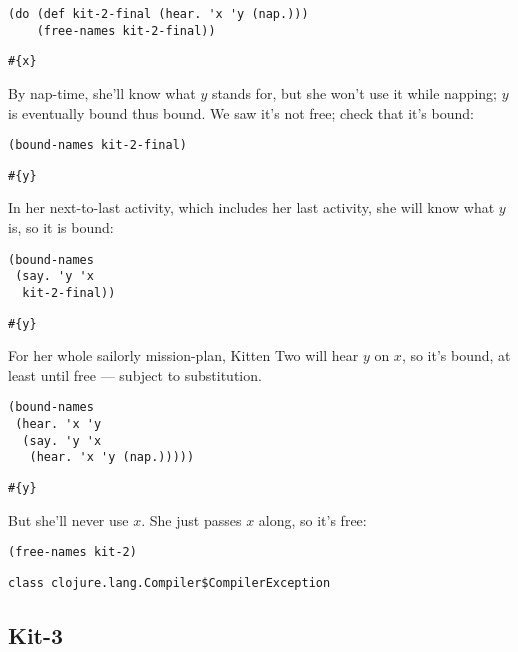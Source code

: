 \documentclass[10pt,oneside,x11names]{article}
\theoremstyle{definition}
\theoremstyle{warning}
\begin{document}
\vskip 0.26cm
\begin{verbatim}
(do (def kit-2-final (hear. 'x 'y (nap.)))
    (free-names kit-2-final))
\end{verbatim}

\begin{verbatim}
#{x}
\end{verbatim}


By nap-time, she'll know what \(y\) stands for, but she won't use it
while napping; \(y\) is eventually bound thus bound. We saw it's not
free; check that it's bound:

\vskip 0.26cm
\begin{verbatim}
(bound-names kit-2-final)
\end{verbatim}

\begin{verbatim}
#{y}
\end{verbatim}


In her next-to-last activity, which includes her last activity,
she will know what \(y\) is, so it is bound:

\vskip 0.26cm
\begin{verbatim}
(bound-names
 (say. 'y 'x
  kit-2-final))
\end{verbatim}

\begin{verbatim}
#{y}
\end{verbatim}


For her whole sailorly mission-plan, Kitten Two will hear \(y\) on
\(x\), so it's bound, at least until free --- subject to
substitution.

\vskip 0.26cm
\begin{verbatim}
(bound-names
 (hear. 'x 'y
  (say. 'y 'x
   (hear. 'x 'y (nap.)))))
\end{verbatim}

\begin{verbatim}
#{y}
\end{verbatim}


But she'll never use \(x\). She just passes \(x\) along, so it's free:

\vskip 0.26cm
\begin{verbatim}
(free-names kit-2)
\end{verbatim}

\begin{verbatim}
class clojure.lang.Compiler$CompilerException
\end{verbatim}

\subsection{Kit-3}
\label{sec:org381fb6a}
\end{document}
